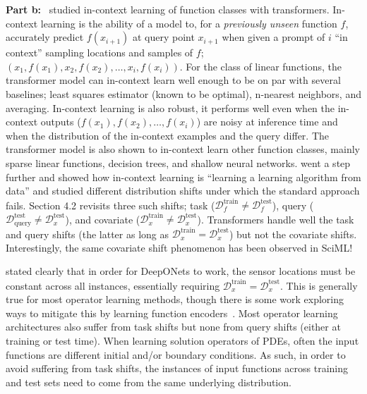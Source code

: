 \documentclass[12pt]{exam}
\def\D{\mathcal{D}}
\begin{document}
\begin{questions}
{\bf Part b:}~\citep{garg2022can} studied in-context learning of function classes with transformers. In-context learning is the ability of a model to, for a {\it previously unseen} function $f$, accurately predict $f(x_{i+1})$ at query point $x_{i+1}$ when given a prompt of $i$ ``in context'' sampling locations and samples of $f$; $\left(x_1, f(x_1), x_2, f(x_2), \dots, x_i, f(x_i) \right)$. For the class of linear functions, the transformer model can in-context learn well enough to be on par with several baselines; least squares estimator (known to be optimal), n-nearest neighbors, and averaging. In-context learning is also robust, it performs well even when the in-context outputs ($f(x_1), f(x_2), \dots, f(x_i)$) are noisy at inference time and when the distribution of the in-context examples and the query differ. The transformer model is also shown to in-context learn other function classes, mainly sparse linear functions, decision trees, and shallow neural networks. \citep{zhang2024trained} went a step further and showed how in-context learning is ``learning a learning algorithm from data'' and studied different distribution shifts under which the standard approach fails. Section 4.2 revisits three such shifts; task ($\D_{f}^{\text{train}} \neq \D_{f}^{\text{test}}$), query ($\D_{\text{query}}^{\text{test}} \neq \D_{x}^{\text{test}}$), and covariate ($\D_{x}^{\text{train}} \neq \D_{x}^{\text{test}}$). Transformers handle well the task and query shifts (the latter as long as $\D_{x}^{\text{train}} = \D_{x}^{\text{test}}$) but not the covariate shifts. Interestingly, the same covariate shift phenomenon has been observed in SciML!

\citep{lu2019deeponet} stated clearly that in order for DeepONets to work, the sensor locations must be constant across all instances, essentially requiring $\D_{x}^{\text{train}} = \D_{x}^{\text{test}}$. This is generally true for most operator learning methods, though there is some work exploring ways to mitigate this by learning function encoders~\citep{ingebrand2025basis, zhang2023belnet}. Most operator learning architectures also suffer from task shifts but none from query shifts (either at training or test time). When learning solution operators of PDEs, often the input functions are different initial and/or boundary conditions. As such, in order to avoid suffering from task shifts, the instances of input functions across training and test sets need to come from the same underlying distribution.
%
\pagebreak

\question


\end{questions}
\end{document}

